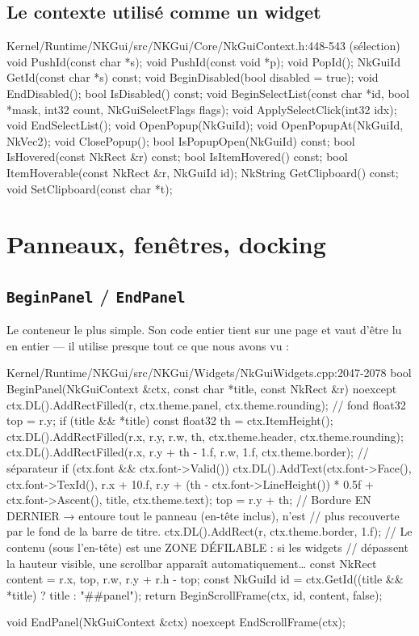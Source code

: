 \subsection{Le contexte utilisé comme un widget}

\begin{nkcode}{Kernel/Runtime/NKGui/src/NKGui/Core/NkGuiContext.h:448-543 (sélection)}
void  PushId(const char *s);  void PushId(const void *p);  void PopId();
NkGuiId GetId(const char *s) const;
void  BeginDisabled(bool disabled = true);  void EndDisabled();  bool IsDisabled() const;
void  BeginSelectList(const char *id, bool *mask, int32 count, NkGuiSelectFlags flags);
void  ApplySelectClick(int32 idx);  void EndSelectList();
void  OpenPopup(NkGuiId);  void OpenPopupAt(NkGuiId, NkVec2);  void ClosePopup();
bool  IsPopupOpen(NkGuiId) const;
bool  IsHovered(const NkRect &r) const;  bool IsItemHovered() const;
bool  ItemHoverable(const NkRect &r, NkGuiId id);
NkString GetClipboard() const;  void SetClipboard(const char *t);
\end{nkcode}

\section{Panneaux, fenêtres, docking}

\subsection{\texttt{BeginPanel} / \texttt{EndPanel}}

Le conteneur le plus simple. Son code entier tient sur une page et vaut d'être lu
en entier — il utilise presque tout ce que nous avons vu :

\begin{nkcode}{Kernel/Runtime/NKGui/src/NKGui/Widgets/NkGuiWidgets.cpp:2047-2078}
bool BeginPanel(NkGuiContext &ctx, const char *title, const NkRect &r) noexcept {
    ctx.DL().AddRectFilled(r, ctx.theme.panel, ctx.theme.rounding); // fond
    float32 top = r.y;
    if (title && *title) {
        const float32 th = ctx.ItemHeight();
        ctx.DL().AddRectFilled({r.x, r.y, r.w, th}, ctx.theme.header, ctx.theme.rounding);
        ctx.DL().AddRectFilled({r.x, r.y + th - 1.f, r.w, 1.f}, ctx.theme.border); // séparateur
        if (ctx.font && ctx.font->Valid()) {
            ctx.DL().AddText(ctx.font->Face(), ctx.font->TexId(),
                             {r.x + 10.f, r.y + (th - ctx.font->LineHeight()) * 0.5f + ctx.font->Ascent()},
                             title, ctx.theme.text);
        }
        top = r.y + th;
    }
    // Bordure EN DERNIER → entoure tout le panneau (en-tête inclus), n'est
    // plus recouverte par le fond de la barre de titre.
    ctx.DL().AddRect(r, ctx.theme.border, 1.f);
    // Le contenu (sous l'en-tête) est une ZONE DÉFILABLE : si les widgets
    // dépassent la hauteur visible, une scrollbar apparaît automatiquement…
    const NkRect content = {r.x, top, r.w, r.y + r.h - top};
    const NkGuiId id = ctx.GetId((title && *title) ? title : "##panel");
    return BeginScrollFrame(ctx, id, content, false);
}

void EndPanel(NkGuiContext &ctx) noexcept { EndScrollFrame(ctx); }
\end{nkcode}

